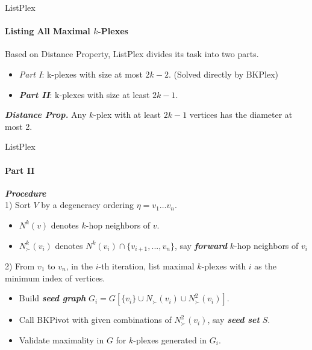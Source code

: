\documentclass[9pt]{beamer} %
\begin{document}
\begin{frame}{ListPlex}
    \framesubtitle{Listing All Maximal $k$-Plexes}
    Based on Distance Property, ListPlex divides its task into two parts.
    \begin{itemize}
        \item \emph{Part I}: k-plexes with size at most $2k-2$. \footnotesize (Solved directly by BKPlex) \normalsize
        \item \emph{\textbf{Part II}}: k-plexes with size at least $2k-1$.
    \end{itemize}
    \vspace{0.25cm}
    \begin{flushright}
        \footnotesize \textbf{\emph{Distance Prop.}} Any $k$-plex with at least $2k-1$ vertices has the diameter at most 2.
    \end{flushright}    
\end{frame}
\begin{frame}{ListPlex}
    \framesubtitle{Part II}
    \textbf{\emph{Procedure}}\\
    \vspace{0.25cm}
    1) Sort $V$ by a degeneracy ordering $\eta=v_1\dots v_n$.\\
    \begin{itemize}
        \item $N^k(v)$ denotes $k$-hop neighbors of $v$.
        \item $N^k_{\succ}(v_i)$ denotes $N^k(v_i) \cap \{v_{i+1},...,v_n\}$, say \textbf{\emph{forward}} $k$-hop neighbors of $v_i$
    \end{itemize}
    \vspace{0.2cm}
    2) From $v_1$ to $v_n$, in the $i$-th iteration, list maximal $k$-plexes with $i$ as the minimum index of vertices.
    \begin{itemize}
        \item Build \textbf{\emph{seed graph}} $G_i= G[\{v_i\}\cup  N_{\succ}(v_i) \cup N^2_{\succ}(v_i)]$.
        \item Call BKPivot with given combinations of $N^2_{\succ}(v_i)$, say \textbf{\emph{seed set}} $S$.
        \item Validate maximality in $G$ for $k$-plexes generated in $G_i$. 
    \end{itemize}
\end{frame}
\end{document}
